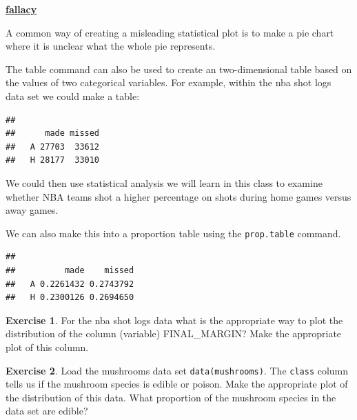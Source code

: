 \documentclass[
]{book}
\newenvironment{Shaded}{\begin{snugshade}}{\end{snugshade}}
\newcommand{\FunctionTok}[1]{\textcolor[rgb]{0.00,0.00,0.00}{#1}}
\newcommand{\NormalTok}[1]{#1}
\newcommand{\SpecialCharTok}[1]{\textcolor[rgb]{0.00,0.00,0.00}{#1}}
\newenvironment{rmdblock}[1]
  {\begin{shaded*}
  \centerline{\underline{\textbf{#1}}}

  }
  {
  \end{shaded*}
  }
\newenvironment{fallacy}
  {\begin{rmdblock}{fallacy}}
  {\end{rmdblock}}
\theoremstyle{definition}
\theoremstyle{definition}
\theoremstyle{definition}
\newtheorem{exercise}{Exercise}[chapter]
\theoremstyle{definition}
\theoremstyle{remark}
\begin{document}
\begin{fallacy}
A common way of creating a misleading statistical plot is to make a pie chart where it is unclear what the whole pie represents.
\end{fallacy}

The table command can also be used to create an two-dimensional table based on the values of two categorical variables. For example, within the nba shot logs data set we could make a table:

\begin{Shaded}
\end{Shaded}

\begin{verbatim}
##    
##      made missed
##   A 27703  33612
##   H 28177  33010
\end{verbatim}

We could then use statistical analysis we will learn in this class to examine whether NBA teams shot a higher percentage on shots during home games versus away games.

We can also make this into a proportion table using the \texttt{prop.table} command.

\begin{Shaded}
\end{Shaded}

\begin{verbatim}
##    
##          made    missed
##   A 0.2261432 0.2743792
##   H 0.2300126 0.2694650
\end{verbatim}

\begin{exercise}
\protect\hypertarget{exr:unnamed-chunk-73}{}\label{exr:unnamed-chunk-73}For the nba shot logs data what is the appropriate way to plot the distribution of the column (variable) FINAL\_MARGIN? Make the appropriate plot of this column.
\end{exercise}

\begin{exercise}
\protect\hypertarget{exr:unnamed-chunk-74}{}\label{exr:unnamed-chunk-74}Load the mushrooms data set \texttt{data(mushrooms)}. The \texttt{class} column tells us if the mushroom species is edible or poison. Make the appropriate plot of the distribution of this data. What proportion of the mushroom species in the data set are edible?
\end{exercise}
\end{document}

